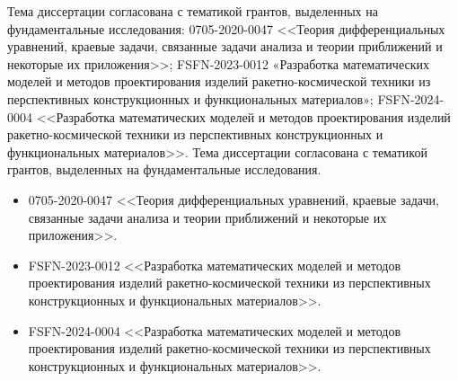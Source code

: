 \ifsynopsis
Тема диссертации согласована с тематикой грантов, выделенных на фундаментальные исследования: 0705-2020-0047 <<Теория дифференциальных уравнений, краевые задачи, связанные задачи анализа и теории приближений и некоторые их приложения>>; FSFN-2023-0012 «Разработка математических моделей и методов проектирования изделий ракетно-космической техники из перспективных конструкционных и функциональных материалов»; FSFN-2024-0004 <<Разработка математических моделей и методов проектирования изделий ракетно-космической техники из перспективных конструкционных и функциональных материалов>>.
\else
Тема диссертации согласована с тематикой грантов, выделенных на фундаментальные исследования.
\begin{itemize}
	\item 0705-2020-0047 <<Теория дифференциальных уравнений, краевые задачи, связанные задачи анализа и теории приближений и некоторые их приложения>>.
	\item FSFN-2023-0012 <<Разработка математических моделей и методов проектирования изделий ракетно-космической техники из перспективных конструкционных и функциональных материалов>>.
	\item FSFN-2024-0004 <<Разработка математических моделей и методов проектирования изделий ракетно-космической техники из перспективных конструкционных и функциональных материалов>>.
\end{itemize}
\fi

